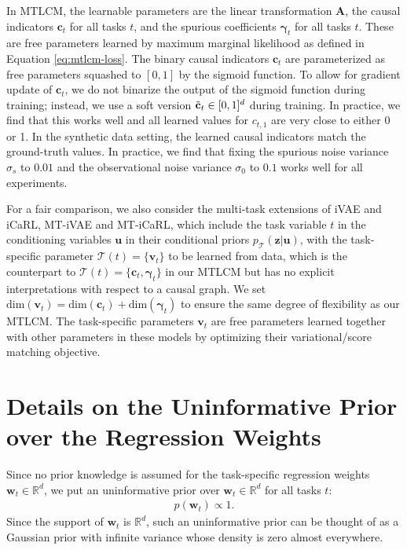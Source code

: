 \documentclass{article} %
\theoremstyle{plain}
\theoremstyle{definition}
\theoremstyle{remark}
\begin{document}
In MTLCM, the learnable parameters are the linear transformation $\mathbf{A}$, the causal indicators $\mathbf{c}_t$ for all tasks $t$, and the spurious coefficients $\boldsymbol{\gamma}_t$ for all tasks $t$. These are free parameters learned by maximum marginal likelihood as defined in Equation \eqref{eq:mtlcm-loss}. The binary causal indicators $\mathbf{c}_t$ are parameterized as free parameters squashed to $[0,1]$ by the sigmoid function. To allow for gradient update of $\mathbf{c}_t$, we do not binarize the output of the sigmoid function during training; instead, we use a soft version $\Tilde{\mathbf{c}}_t\in[0,1]^d$ during training. In practice, we find that this works well and all learned values for $c_{t,1}$ are very close to either 0 or 1. In the synthetic data setting, the learned causal indicators match the ground-truth values. In practice, we find that fixing the spurious noise variance $\sigma_s$ to $0.01$ and the observational noise variance $\sigma_0$ to $0.1$ works well for all experiments.

For a fair comparison, we also consider the multi-task extensions of iVAE and iCaRL, MT-iVAE and MT-iCaRL, which include the task variable $t$ in the conditioning variables $\mathbf{u}$ in their conditional priors $p_{\mathcal{T}}(\mathbf{z}|\mathbf{u})$, with the task-specific parameter $\mathcal{T}(t)=\{\mathbf{v}_t\}$ to be learned from data, which is the counterpart to $\mathcal{T}(t)=\{\mathbf{c}_t,\boldsymbol{\gamma}_t\}$ in our MTLCM but has no explicit interpretations with respect to a causal graph. We set $\text{dim}(\mathbf{v}_t)=\text{dim}(\mathbf{c}_t)+\text{dim}(\boldsymbol{\gamma}_t)$ to ensure the same degree of flexibility as our MTLCM. The task-specific parameters $\mathbf{v}_t$ are free parameters learned together with other parameters in these models by optimizing their variational/score matching objective.

\section{Details on the Uninformative Prior over the Regression Weights}\label{appendix:uninformative prior}
Since no prior knowledge is assumed for the task-specific regression weights $\mathbf{w}_t\in\mathbb{R}^d$, we put an uninformative prior over $\mathbf{w}_t\in\mathbb{R}^d$ for all tasks $t$:
\begin{align}
    p(\mathbf{w}_t)\propto 1.
\end{align}
Since the support of $\mathbf{w}_t$ is $\mathbb{R}^d$, such an uninformative prior can be thought of as a Gaussian prior with infinite variance whose density is zero almost everywhere.
\end{document}
